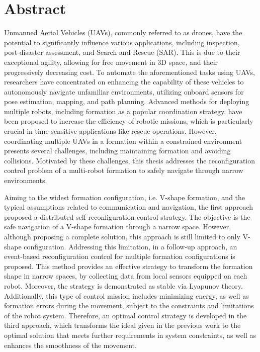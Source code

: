 \chapter*{Abstract}

Unmanned Aerial Vehicles (UAVs), commonly referred to as drones, have the potential to significantly influence various applications, including inspection, post-disaster assessment, and Search and Rescue (SAR). This is due to their exceptional agility, allowing for free movement in 3D space, and their progressively decreasing cost. To automate the aforementioned tasks using UAVs, researchers have concentrated on enhancing the capability of these vehicles to autonomously navigate unfamiliar environments, utilizing onboard sensors for pose estimation, mapping, and path planning. Advanced methods for deploying multiple robots, including formation as a popular coordination strategy, have been proposed to increase the efficiency of robotic missions, which is particularly crucial in time-sensitive applications like rescue operations. However, coordinating multiple UAVs in a formation within a constrained environment presents several challenges, including maintaining formation and avoiding collisions. Motivated by these challenges, this thesis addresses the reconfiguration control problem of a multi-robot formation to safely navigate through narrow environments.

Aiming to the widest formation configuration, i.e. V-shape formation, and the typical assumptions related to communication and navigation, the first approach proposed a distributed self-reconfiguration control strategy. The objective is the safe navigation of a V-shape formation through a narrow space. However, although proposing a complete solution, this approach is still limited to only V-shape configuration. Addressing this limitation, in a follow-up approach, an event-based reconfiguration control for multiple formation configurations is proposed. This method provides an effective strategy to transform the formation shape in narrow spaces, by collecting data from local sensors equipped on each robot. Moreover, the strategy is demonstrated as stable via Lyapunov theory. Additionally, this type of control mission includes minimizing energy, as well as formation errors during the movement, subject to the constraints and limitations of the robot system. Therefore, an optimal control strategy is developed in the third approach, which transforms the ideal given in the previous work to the optimal solution that meets further requirements in system constraints, as well as enhances the smoothness of the movement.

